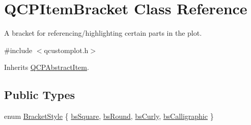 \hypertarget{class_q_c_p_item_bracket}{\section{Q\-C\-P\-Item\-Bracket Class Reference}
\label{class_q_c_p_item_bracket}
}


A bracket for referencing/highlighting certain parts in the plot.  




{\ttfamily \#include $<$qcustomplot.\-h$>$}



Inherits \hyperlink{class_q_c_p_abstract_item}{Q\-C\-P\-Abstract\-Item}.

\subsection*{Public Types}
\begin{DoxyCompactItemize}
\item 
enum \hyperlink{class_q_c_p_item_bracket_a7ac3afd0b24a607054e7212047d59dbd}{Bracket\-Style} \{ \hyperlink{class_q_c_p_item_bracket_a7ac3afd0b24a607054e7212047d59dbda7f9df4a7359bfe3dac1dbe4ccf5d220c}{bs\-Square}, 
\hyperlink{class_q_c_p_item_bracket_a7ac3afd0b24a607054e7212047d59dbda394627b0830a26ee3e0a02ca67a9f918}{bs\-Round}, 
\hyperlink{class_q_c_p_item_bracket_a7ac3afd0b24a607054e7212047d59dbda5024ce4023c2d8de4221f1cd4816acd8}{bs\-Curly}, 
\hyperlink{class_q_c_p_item_bracket_a7ac3afd0b24a607054e7212047d59dbda8f29f5ef754e2dc9a9efdedb2face0f3}{bs\-Calligraphic}
 \}
\end{DoxyCompactItemize}
